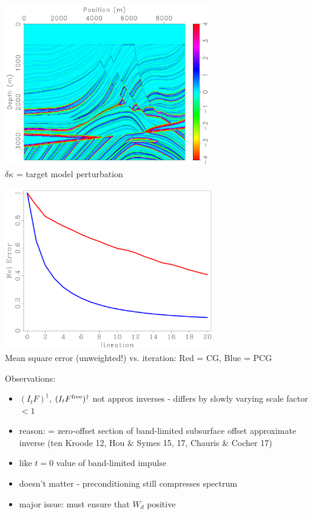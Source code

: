 \documentclass[xcolor=dvipsnames,12pt,aspectratio=169]{beamer}
\begin{document}
\begin{frame}
\vspace{-0.5cm}
\begin{center}
\includegraphics[height=7cm]{Fig/fine1dbulk}\\
$\delta \kappa$ = target model perturbation
\end{center}
\end{frame}

\begin{frame}
\vspace{-0.5cm}
\begin{center}
\includegraphics[height=7cm]{Fig/fine1comp}\\
Mean square error (unweighted!) vs. iteration: Red = CG, Blue = PCG
\end{center}
\end{frame}

\begin{frame}
Observations:
\begin{itemize}
\item $(I_tF)^{\dagger}$, $(I_tF^{\rm free})^{\dagger}$ not approx inverses - differs by slowly varying scale factor $< 1$
\item reason: = zero-offset section of band-limited subsurface offset approximate inverse (ten Kroode 12, Hou \& Symes 15, 17, Chauris \& Cocher 17) 
\item like $t=0$ value of band-limited impulse
\item doesn't matter - preconditioning still compresses spectrum 
\item major issue: must ensure that $W_d$ positive
\end{itemize}
\end{frame}
\end{document}
